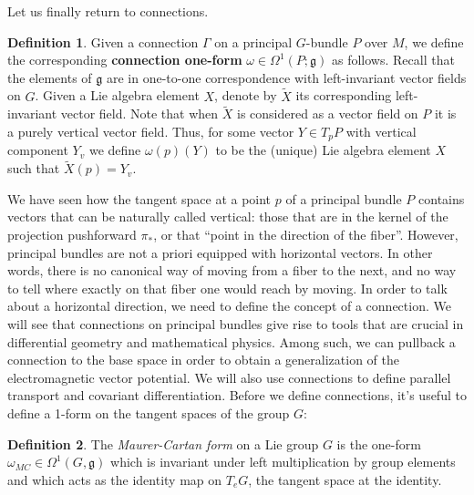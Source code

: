 \documentclass{book}
\newcommand{\fr}{\mathfrak}
\theoremstyle{plain}
\theoremstyle{definition}
\newtheorem{defn}{Definition}
\theoremstyle{remark}
\begin{document}
Let us finally return to connections.
\begin{defn}
    Given a connection $\Gamma$ on a principal $G$-bundle $P$ over $M$, we define the corresponding \textbf{connection one-form} $\omega\in \Omega^1(P;\fr g)$
    as follows. Recall that the elements of $\fr g$ are in one-to-one correspondence with left-invariant vector fields on $G$. Given a Lie algebra
    element $X$, denote by $\tilde X$ its corresponding left-invariant vector field. Note that when $\tilde X$ is considered
    as a vector field on $P$ it is a purely vertical vector field. Thus, for some vector $Y\in T_pP$ with vertical component $Y_v$ we define
    $\omega(p)(Y)$ to be the (unique) Lie algebra element $X$ such that $\tilde X(p)=Y_v$.
\end{defn}











We have seen how the tangent space at a point $p$ of a principal bundle $P$ contains vectors that can be naturally called vertical: those that are in the kernel of the projection pushforward $\pi_*$, or that ``point in the direction of the fiber''. However, principal bundles are not a priori equipped with horizontal vectors. In other words, there is no canonical way of moving from a fiber to the next, and no way to tell where exactly on that fiber one would reach by moving. In order to talk about a horizontal direction, we need to define the concept of a connection. We will see that connections on principal bundles give rise to tools that are crucial in differential geometry and mathematical physics. Among such, we can pullback a connection to the base space in order to obtain a generalization of the electromagnetic vector potential. We will also use connections to define parallel transport and covariant differentiation. Before we define connections, it's useful to define a 1-form on the tangent spaces of the group $G$:

\begin{defn}
    The \emph{Maurer-Cartan form} on a Lie group $G$ is the one-form $\omega_{MC} \in \Omega^1(G, \fr g)$ which is invariant under left multiplication by group elements and which acts as the identity map on $T_eG$, the tangent space at the identity.
\end{defn}
\end{document}
